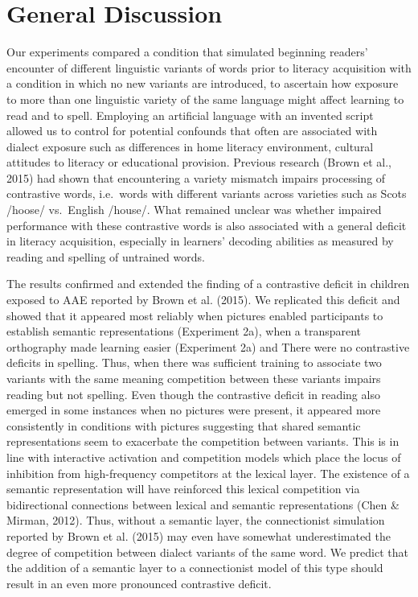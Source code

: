 \documentclass[doc,floatsintext]{apa6}
\begin{document}
\section{General Discussion}\label{general-discussion}

Our experiments compared a condition that simulated beginning readers'
encounter of different linguistic variants of words prior to literacy
acquisition with a condition in which no new variants are introduced, to
ascertain how exposure to more than one linguistic variety of the same
language might affect learning to read and to spell. Employing an
artificial language with an invented script allowed us to control for
potential confounds that often are associated with dialect exposure such
as differences in home literacy environment, cultural attitudes to
literacy or educational provision. Previous research (Brown et al.,
2015) had shown that encountering a variety mismatch impairs processing
of contrastive words, i.e.~words with different variants across
varieties such as Scots /hoose/ vs.~English /house/. What remained
unclear was whether impaired performance with these contrastive words is
also associated with a general deficit in literacy acquisition,
especially in learners' decoding abilities as measured by reading and
spelling of untrained words.

The results confirmed and extended the finding of a contrastive deficit
in children exposed to AAE reported by Brown et al. (2015). We
replicated this deficit and showed that it appeared most reliably when
pictures enabled participants to establish semantic representations
(Experiment 2a), when a transparent orthography made learning easier
(Experiment 2a) and There were no contrastive deficits in spelling.
Thus, when there was sufficient training to associate two variants with
the same meaning competition between these variants impairs reading but
not spelling. Even though the contrastive deficit in reading also
emerged in some instances when no pictures were present, it appeared
more consistently in conditions with pictures suggesting that shared
semantic representations seem to exacerbate the competition between
variants. This is in line with interactive activation and competition
models which place the locus of inhibition from high-frequency
competitors at the lexical layer. The existence of a semantic
representation will have reinforced this lexical competition via
bidirectional connections between lexical and semantic representations
(Chen \& Mirman, 2012). Thus, without a semantic layer, the
connectionist simulation reported by Brown et al. (2015) may even have
somewhat underestimated the degree of competition between dialect
variants of the same word. We predict that the addition of a semantic
layer to a connectionist model of this type should result in an even
more pronounced contrastive deficit.
\end{document}
